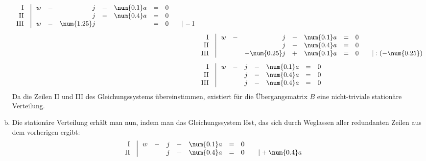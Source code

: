 \begin{exercise}
\begin{enumerate}[a)]
\begin{alignat*}{1}
\begin{array}{r|rcrcrcll}
                  \text{I}\;\;&\; w & - &           j & - & \num{0.1}a & = & 0 & \quad\relax \\
                 \text{II}\;\;&\;   &   &           j & - & \num{0.4}a & = & 0 & \quad\relax \\
                \text{III}\;\;&\; w & - & \num{1.25}j &   &            & = & 0 & \quad|-\text{I}
                \end{array}
                \\[1ex] &
                \begin{array}{r|rcrcrcll}
                  \text{I}\;\;&\; w & - &            j & - & \num{0.1}a & = & 0 & \quad\relax \\
                 \text{II}\;\;&\;   &   &            j & - & \num{0.4}a & = & 0 & \quad\relax \\
                \text{III}\;\;&\;   &   & -\num{0.25}j & + & \num{0.1}a & = & 0 & \quad|:(-\num{0.25})
                \end{array}
                \\[1ex] &
                \begin{array}{r|rcrcrcll}
                  \text{I}\;\;&\; w & - & j & - & \num{0.1}a & = & 0 & \quad\relax \\
                 \text{II}\;\;&\;   &   & j & - & \num{0.4}a & = & 0 & \quad\relax \\
                \text{III}\;\;&\;   &   & j & - & \num{0.4}a & = & 0 & \quad\relax
                \end{array}
              \end{alignat*}
            \endgroup
            Da die Zeilen II und III des Gleichungssystems
            übereinstimmen, existiert für die Übergangsmatrix
            $B$ eine nicht-triviale stationäre Verteilung.
      \item Die stationäre Verteilung erhält man nun,
            indem man das Gleichungssystem löst, das
            sich durch Weglassen aller redundanten
            Zeilen aus dem vorherigen ergibt:
            \begingroup
              \renewcommand{\arraycolsep}{2pt}%
              \begin{alignat*}{1}
                &
                \begin{array}{r|rcrcrcll}
                 \text{I}\;\;&\; w & - & j & - & \num{0.1}a & = & 0 & \quad\relax \\
                \text{II}\;\;&\;   &   & j & - & \num{0.4}a & = & 0 & \quad|+\num{0.4} a
                \end{array}

\end{alignat*}
\end{enumerate}
\end{exercise}
